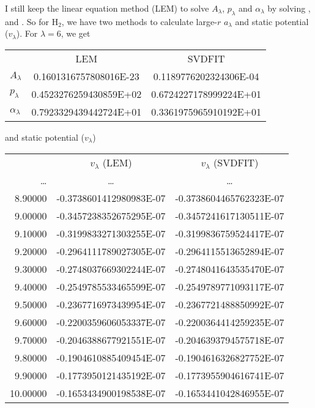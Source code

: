 \documentclass[aps,pra,groupedaddress,
                amsfonts,amssymb,
                preprint
    ]{revtex4}
\begin{document}
I still keep the linear equation method (LEM) to solve $A_\lambda$,
$p_\lambda$ and $\alpha_\lambda$ by solving ,  and
. So for H$_2$, we have two methods to calculate large-$r$
$a_\lambda$ and static potential ($v_\lambda$). For $\lambda=6$, we get
\begin{center}
\begin{tabular}{lcc}
                 & LEM & SVDFIT \\
     $A_\lambda$ & \quad 0.1601316757808016E-23  & \quad 0.1189776202324306E-04 \\
     $p_\lambda$ & \quad 0.4523276259430859E+02  & \quad 0.6724227178999224E+01 \\
$\alpha_\lambda$ & \quad 0.7923329439442724E+01  & \quad 0.3361975965910192E+01
\end{tabular}
\end{center}
and static potential ($v_\lambda$)
\begin{center}
\begin{tabular}{rcc}
                     & $v_\lambda$ (LEM) & $v_\lambda$ (SVDFIT) \\
   \ldots  &  \ldots      & \ldots         \\
   8.90000 &  \quad -0.3738601412980983E-07 &   \quad  -0.3738604465762323E-07  \\
   9.00000 &  \quad -0.3457238352675295E-07 &   \quad  -0.3457241617130511E-07  \\
   9.10000 &  \quad -0.3199833271303255E-07 &   \quad  -0.3199836759524417E-07  \\
   9.20000 &  \quad -0.2964111789027305E-07 &   \quad  -0.2964115513652894E-07  \\
   9.30000 &  \quad -0.2748037669302244E-07 &   \quad  -0.2748041643535470E-07  \\
   9.40000 &  \quad -0.2549785533465599E-07 &   \quad  -0.2549789771093117E-07  \\
   9.50000 &  \quad -0.2367716973439954E-07 &   \quad  -0.2367721488850992E-07  \\
   9.60000 &  \quad -0.2200359606053337E-07 &   \quad  -0.2200364414259235E-07  \\
   9.70000 &  \quad -0.2046388677921551E-07 &   \quad  -0.2046393794575718E-07  \\
   9.80000 &  \quad -0.1904610885409454E-07 &   \quad  -0.1904616326827752E-07  \\
   9.90000 &  \quad -0.1773950121435192E-07 &   \quad  -0.1773955904616741E-07  \\
  10.00000 &  \quad -0.1653434900198538E-07 &   \quad  -0.1653441042846955E-07  

\end{tabular}
\end{center}
\end{document}
